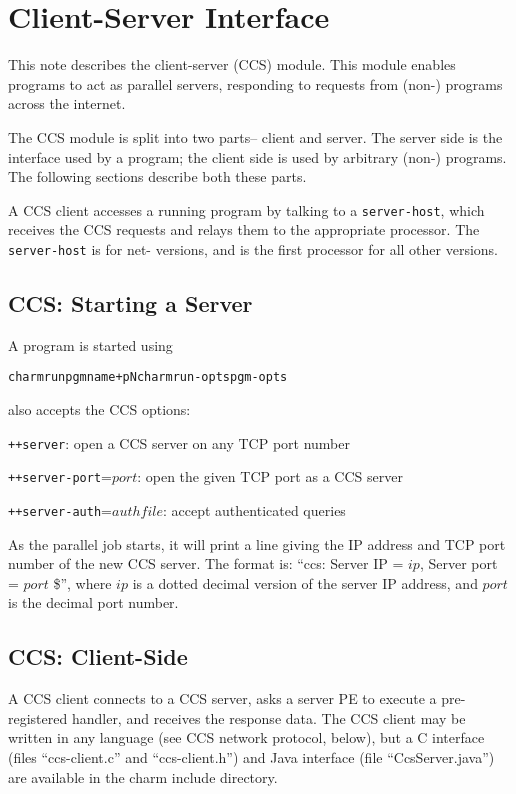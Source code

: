 \chapter{\converse{} Client-Server Interface}

This note describes the \converse{} client-server (CCS) 
module. This module enables \converse{} programs to act as
parallel servers, responding to requests from (non-\converse{}) programs
across the internet.

The CCS module is split into two parts-- client and server. 
The server side is the interface used by a \converse{} program;
the client side is used by arbitrary (non-\converse{}) programs.
The following sections describe both these parts. 

A CCS client accesses a running \converse{} program by talking to
a {\tt server-host}, which receives the CCS requests and relays them
to the appropriate processor.  The {\tt server-host} is 
for net- versions, and is the first processor for all other versions.


\section{CCS: Starting a Server}
A \converse{} program is started using
\begin{alltt}
charmrun pgmname +pN charmrun-opts pgm-opts
\end{alltt}
 also accepts the CCS options:

{\tt ++server}: open a CCS server on any TCP port number

{\tt ++server-port}=$port$: open the given TCP port as a CCS server   

{\tt ++server-auth}=$authfile$: accept authenticated queries

As the parallel job starts, it will print a line giving the 
IP address and TCP port number of the new CCS server.
The format is: ``ccs: Server IP = $ip$, Server port = $port$ \$'',
where $ip$ is a dotted decimal version of the 
server IP address, and $port$ is the decimal port number.

\section{CCS: Client-Side}

A CCS client connects to a CCS server, asks a server PE to 
execute a pre-registered handler, and receives the response data.
The CCS client may be written in any language (see CCS network protocol,
below), but a C interface (files ``ccs-client.c'' and ``ccs-client.h'') 
and Java interface (file ``CcsServer.java'') are available in 
the charm include directory.

